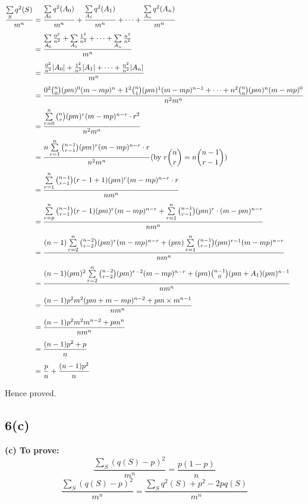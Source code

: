 \documentclass[12pt]{article}
\begin{document}
\begin{align*}
\frac{\sum\limits_S q^2(S)}{m^n} 
&= \frac{\sum\limits_{A_0} q^2(A_0)}{m^n} + \frac{\sum\limits_{A_1} q^2(A_1)}{m^n} + \dots + \frac{\sum\limits_{A_n} q^2(A_n)}{m^n} \\[4pt]
&= \frac{\sum\limits_{A_0} \frac{0^2}{n^2} + \sum\limits_{A_1} \frac{1^2}{n^2} + \dots + \sum\limits_{A_n} \frac{n^2}{n^2}}{m^n} \\[4pt]
&= \frac{\frac{0^2}{n^2} |A_0| + \frac{1^2}{n^2} |A_1| + \dots + \frac{n^2}{n^2} |A_n|}{m^n} \\[4pt]
&= \frac{0^2 \binom{n}{0} (pm)^0 (m-mp)^n + 1^2 \binom{n}{1} (pm)^1 (m-mp)^{n-1} + \dots + n^2 \binom{n}{n} (pm)^n (m-mp)^0}{n^2 m^n} \\[4pt]
&= \frac{\sum\limits_{r=0}^n \binom{n}{r} (pm)^r (m-mp)^{n-r} \cdot r^2}{n^2 m^n} \\[4pt]
&= \frac{n \sum\limits_{r=1}^n \binom{n-1}{r-1}  (pm)^r (m-mp)^{n-r} \cdot r}{n^2 m^n} \hfill \text{(by $r\binom{n}{r} = n\binom{n-1}{r-1})$ }\\[4pt] 
&= \frac{\sum\limits_{r=1}^n \binom{n-1}{r-1} (r-1+1)(pm)^r (m-mp)^{n-r} \cdot r}{n m^n} \\[4pt]
&= \frac{\sum\limits_{r=p}^n \binom{n-1}{r-1} (r-1)(pm)^r (m-mp)^{n-r} + \sum\limits_{r=1}^n \binom{n-1}{r-1} (pm)^r \cdot (m-pm)^{n-r}}{n m^n} \\[4pt]
&= \frac{(n-1) \sum\limits_{r=2}^n \binom{n-2}{r-2} (pm)^r (m-mp)^{n-r} + (pm) \sum\limits_{r=1}^n \binom{n-1}{r-1} (pm)^{r-1} (m-mp)^{n-r}}{n m^n} \\[4pt]
&= \frac{(n-1)(pm)^2 \sum\limits_{r=2}^n \binom{n-2}{r-2} (pm)^{r-2} (m-mp)^{n-r} + (pm) \binom{n-1}{0}(pm + A_1)(pm)^{n-1}}{n m^n}\\[4pt]
&= \frac{(n-1)p^2 m^2 (pm + m - mp)^{n-2} + p m \times m^{n-1}}{n m^n} \\[4pt]
&= \frac{(n-1)p^2 m^2 m^{n-2} + p m^n}{n m^n} \\[4pt]
&= \frac{(n-1)p^2 + p}{n} \\[4pt]
&= \frac{p}{n} + \frac{(n-1)p^2}{n}
\end{align*}

Hence proved.
\subsection{6(c)}
\textbf{(c) To prove:} 
\[
\frac{\sum\limits_S \left( q(S) - p \right)^2}{m^n} 
= \frac{p(1-p)}{n}
\]
\[
\frac{\sum\limits_S \left( q(S) - p \right)^2}{m^n} 
= \frac{\sum\limits_S q^2(S) + p^2 - 2p q(S)}{m^n}
\]
\end{document}
